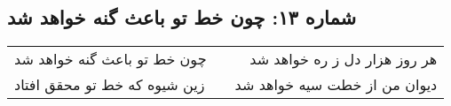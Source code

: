 \begin{center}
\section*{شماره ۱۳: چون خط تو باعث گنه خواهد شد}
\label{sec:013}
\begin{longtable}{l p{0.5cm} r}
چون خط تو باعث گنه خواهد شد
&&
هر روز هزار دل ز ره خواهد شد
\\
زین شیوه که خط تو محقق افتاد
&&
دیوان من از خطت سیه خواهد شد
\\
\end{longtable}
\end{center}
